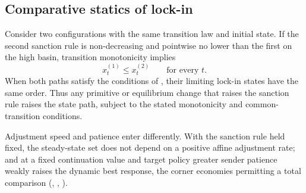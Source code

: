 \subsection{Comparative statics of lock-in}
\label{sec:compstat:lockin}

Consider two configurations with the same transition law and initial
state. If the second sanction rule is non-decreasing and
pointwise no lower than the first on the high basin, transition
monotonicity implies
\[
x_t^{(1)}\le x_t^{(2)}\qquad\text{for every }t.
\]
When both paths satisfy the conditions of , their limiting
lock-in states have the same order. Thus any primitive or equilibrium
change that raises the sanction rule raises the state path, subject
to the stated monotonicity and common-transition conditions.

Adjustment speed and patience enter differently. With the sanction rule held
fixed, the steady-state set does not depend on a positive affine adjustment
rate; and at a fixed continuation value and target policy greater sender
patience weakly raises the dynamic best response, the corner economies permitting a
total comparison (,
, ).
